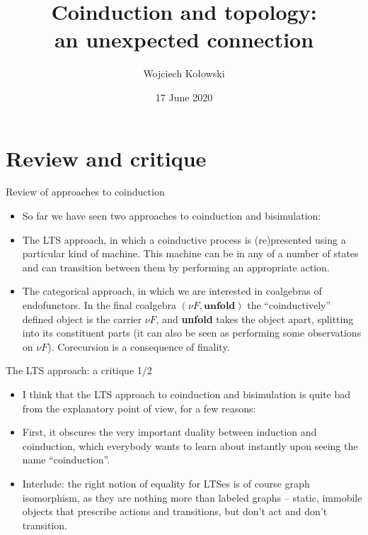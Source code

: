 \documentclass{beamer}
\title{Coinduction and topology:\\an unexpected connection}
\author{Wojciech Kołowski}
\date{17 June 2020}
\begin{document}
\frame{\titlepage}

\frame{\tableofcontents}

\section{Review and critique}

\begin{frame}{Review of approaches to coinduction}
\begin{itemize}
	\item So far we have seen two approaches to coinduction and bisimulation:
	\item The LTS approach, in which a coinductive process is (re)presented using a particular kind of machine. This machine can be in any of a number of states and can transition between them by performing an appropriate action.
	\item The categorical approach, in which we are interested in coalgebras of endofunctors. In the final coalgebra $(\nu F, \textbf{unfold})$ the ``coinductively'' defined object is the carrier $\nu F$, and \textbf{unfold} takes the object apart, splitting into its constituent parts (it can also be seen as performing some observations on $\nu F$). Corecursion is a consequence of finality.
\end{itemize}
\end{frame}

\begin{frame}{The LTS approach: a critique 1/2}
\begin{itemize}
	\item I think that the LTS approach to coinduction and bisimulation is quite bad from the explanatory point of view, for a few reasons:
	\item First, it obscures the very important duality between induction and coinduction, which everybody wants to learn about instantly upon seeing the name ``coinduction''.
	\item Interlude: the right notion of equality for LTSes is of course graph isomorphism, as they are nothing more than labeled graphs -- static, immobile objects that prescribe actions and transitions, but don't act and don't transition.
\end{itemize}
\end{frame}
\end{document}
